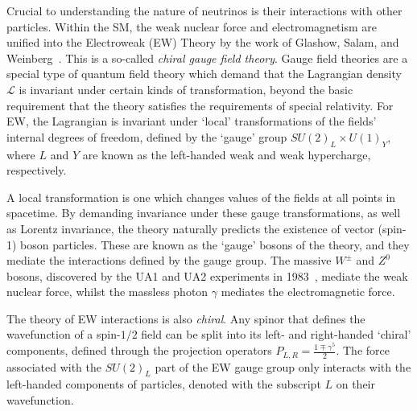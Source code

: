 Crucial to understanding the nature of neutrinos is their interactions with other particles. Within the SM, the weak nuclear force and electromagnetism are unified into the Electroweak (EW) Theory by the work of Glashow, Salam, and Weinberg~\cite{glashowPartialsymmetriesWeakInteractions1961,weinbergModelLeptons1967,salamWeakElectromagneticInteractions1994}. %
This is a so-called \textit{chiral gauge field theory}. Gauge field theories are a special type of quantum field theory which demand that the Lagrangian density $\mathcal{L}$ is invariant under certain kinds of transformation, beyond the basic requirement that the theory satisfies the requirements of special relativity. For EW, the Lagrangian is invariant under `local' transformations of the fields' internal degrees of freedom, defined by the `gauge' group $SU(2)_{L}\times U(1)_{Y}$, where $L$ and $Y$ are known as the left-handed weak and weak hypercharge, respectively.

A local transformation is one which changes values of the fields at all points in spacetime. By demanding invariance under these gauge transformations, as well as Lorentz invariance, the theory naturally predicts the existence of vector (spin-1) boson particles. These are known as the `gauge' bosons of the theory, and they mediate the interactions defined by the gauge group. The massive $W^{\pm}$ and $Z^{0}$ bosons, discovered by the UA1 and UA2 experiments in 1983~\cite{arnisonExperimentalObservationIsolated1983,bannerObservationSingleIsolated1983,arnisonExperimentalObservationLepton1983}, %
mediate the weak nuclear force, whilst the massless photon $\gamma$ mediates the electromagnetic force.

The theory of EW interactions is also \textit{chiral}. Any spinor that defines the wavefunction of a spin-$1/2$ field can be split into its left- and right-handed `chiral' components, defined through the projection operators $P_{L,R} = \frac{1\mp\gamma^{5}}{2}$. The force associated with the $SU(2)_{L}$ part of the EW gauge group only interacts with the left-handed components of particles, denoted with the subscript $L$ on their wavefunction.


